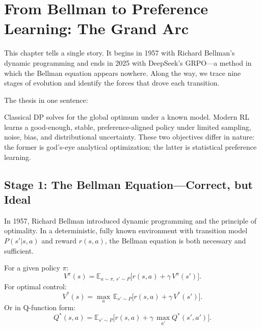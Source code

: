 \chapter{From Bellman to Preference Learning: The Grand Arc}
\label{ch:grand-arc}

This chapter tells a single story.
It begins in 1957 with Richard Bellman's dynamic programming and ends in 2025 with DeepSeek's GRPO---a method in which the Bellman equation appears nowhere.
Along the way, we trace nine stages of evolution and identify the forces that drove each transition.

The thesis in one sentence:

\begin{keyidea}
Classical DP solves for the global optimum under a known model.
Modern RL learns a good-enough, stable, preference-aligned policy under limited sampling, noise, bias, and distributional uncertainty.
These two objectives differ in nature: the former is god's-eye analytical optimization; the latter is statistical preference learning.
\end{keyidea}

\section{Stage 1: The Bellman Equation---Correct, but Ideal}
\label{sec:stage1-dp}

In 1957, Richard Bellman introduced dynamic programming and the principle of optimality.
In a deterministic, fully known environment with transition model $P(s'|s,a)$ and reward $r(s,a)$, the Bellman equation is both necessary and sufficient.

For a given policy $\pi$:
\begin{equation}
V^{\pi}(s) = \mathbb{E}_{a \sim \pi,\, s' \sim P}\bigl[r(s,a) + \gamma\, V^{\pi}(s')\bigr].
\end{equation}
For optimal control:
\begin{equation}
V^{\ast}(s) = \max_a\, \mathbb{E}_{s' \sim P}\bigl[r(s,a) + \gamma\, V^{\ast}(s')\bigr].
\end{equation}
Or in Q-function form:
\begin{equation}
\label{eq:bellman-q}
Q^{\ast}(s,a) = \mathbb{E}_{s' \sim P}\bigl[r(s,a) + \gamma\, \max_{a'} Q^{\ast}(s',a')\bigr].
\end{equation}

